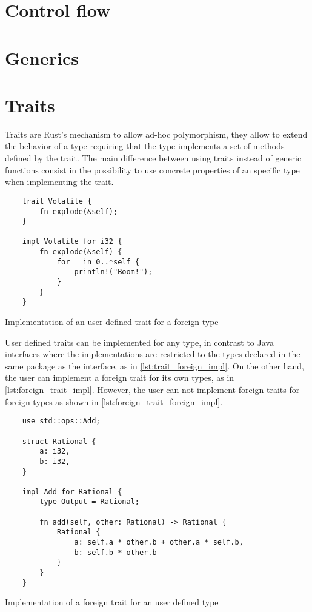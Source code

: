 \section{Control flow}
\section{Generics}

\section{Traits}
Traits are Rust's mechanism to allow ad-hoc polymorphism, they allow to extend the behavior of a type requiring that the type implements a set of methods defined by the trait. The main difference between using traits instead of generic functions consist in the possibility to use concrete properties of an specific type when implementing the trait.

\begin{listing}[h]
	\begin{verbatim}
    trait Volatile {
        fn explode(&self);
    }

    impl Volatile for i32 {
        fn explode(&self) {
            for _ in 0..*self {
                println!("Boom!");
            }
        }
    }
    \end{verbatim}
  \caption{Implementation of an user defined trait for a foreign type}
  \label{lst:trait_foreign_impl}
\end{listing}

User defined traits can be implemented for any type, in contrast to Java interfaces where the implementations are restricted to the types declared in the same package as the interface, as in \ref{lst:trait_foreign_impl}. On the other hand, the user can implement a foreign trait for its own types, as in \ref{lst:foreign_trait_impl}. However, the user can not implement foreign traits for foreign types as shown in \ref{lst:foreign_trait_foreign_impl}.

\begin{listing}[h]
	\begin{verbatim}
    use std::ops::Add;

    struct Rational {
        a: i32,
        b: i32,
    }

    impl Add for Rational {
        type Output = Rational;
        
        fn add(self, other: Rational) -> Rational {
            Rational {
                a: self.a * other.b + other.a * self.b,
                b: self.b * other.b
            }
        }
    }
    \end{verbatim}
  \caption{Implementation of a foreign trait for an user defined type}
  \label{lst:foreign_trait_impl}
\end{listing}

